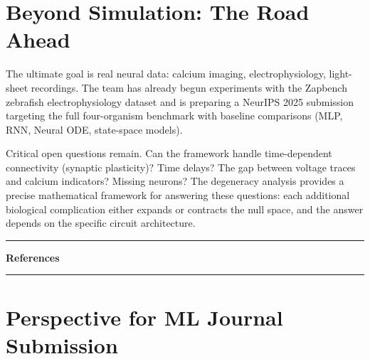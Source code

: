 \documentclass[11pt,twocolumn]{article}
\begin{document}
\section{Beyond Simulation: The Road Ahead}

The ultimate goal is real neural data: calcium imaging, electrophysiology, light-sheet recordings. The team has already begun experiments with the Zapbench zebrafish electrophysiology dataset and is preparing a NeurIPS 2025 submission targeting the full four-organism benchmark with baseline comparisons (MLP, RNN, Neural ODE, state-space models).

Critical open questions remain. Can the framework handle time-dependent connectivity (synaptic plasticity)? Time delays? The gap between voltage traces and calcium indicators? Missing neurons? The degeneracy analysis provides a precise mathematical framework for answering these questions: each additional biological complication either expands or contracts the null space, and the answer depends on the specific circuit architecture.

\vspace{0.4cm}
\noindent\rule{\columnwidth}{0.6pt}

\noindent\textbf{References}


\vspace{0.6cm}
\noindent\rule{\columnwidth}{0.6pt}

\section*{\color{quantablue}Perspective for ML Journal Submission}
\end{document}

